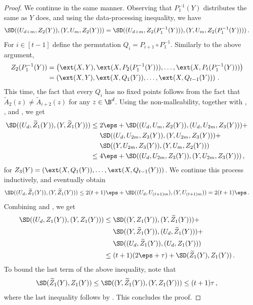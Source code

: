 \begin{proof}
We continue in the same manner. Observing that $P_{1}^{-1}(Y)$ distributes the same as $Y$
does, and using the data-processing inequality, we have
\begin{equation}\label{eq:sec45}
\SD((U_{d+m},Z_{2}(Y)),(Y,U_m,Z_{2}(Y))) = 
\SD((U_{d+m},Z_{2}(P_{1}^{-1}(Y))),(Y,U_m,Z_{2}(P_{1}^{-1}(Y))))\,.
\end{equation}
For $i \in [t-1]$ define the permutation $Q_i = P_{i+1} \circ P_1^{-1}$.
Similarly to the above argument,
\begin{align*}
Z_{2}(P_{1}^{-1}(Y)) &= \left( \ext(X,Y),\ext(X,P_{2}(P_{1}^{-1}(Y))),\ldots,\ext(X,P_{t}(P_{1}^{-1}(Y))) \right) \\
&= \left( \ext(X,Y),\ext(X,Q_{1}(Y)),\ldots,\ext(X,Q_{t-1}(Y)) \right)\,.
\end{align*}
This time, the fact that every $Q_i$ has no
fixed points follows from the fact that $\widetilde{A}_{2}(z) \neq \widetilde{A}_{i+2}(z)$ for
any $z \in \B^{d}$. Using the non-malleability, together with
, ,
and , we get 
\begin{align*}
\SD((U_d,\widetilde{Z}_1(Y)),(Y,\widetilde{Z}_1(Y))) &\le 2\eps + \SD((U_{d},U_{m},Z_{2}(Y)),(U_{d},U_{2m},Z_{3}(Y))) + \\
&~~~~ \SD((U_d,U_{2m},Z_{3}(Y)),(Y,U_{2m},Z_{3}(Y))) + \\
&~~~~ \SD((Y,U_{2m},Z_{3}(Y)),(Y,U_{m},Z_{2}(Y))) \\
&\le 4\eps + \SD((U_d,U_{2m},Z_{3}(Y)),(Y,U_{2m},Z_{3}(Y)))\,,
\end{align*}
for $Z_{3}(Y) = \left( \ext(X,Q_{1}(Y)),\ldots,\ext(X,Q_{t-1}(Y)) \right)$. We continue
this process inductively, and eventually obtain
\begin{equation}\label{eq:sec46}
\SD((U_d,\widetilde{Z}_1(Y)),(Y,\widetilde{Z}_1(Y))) \le 2(t+1)\eps + \SD((U_d,U_{(t+1)m}),(Y,U_{(t+1)m})) = 2(t+1)\eps\,.
\end{equation}
Combining  and 
, we get
\begin{align*}
\SD((U_d,Z_1(Y)),(Y,Z_1(Y))) &\le \SD((Y,Z_1(Y)),(Y,\widetilde{Z}_{1}(Y))) + \\ &~~~~\SD((Y,\widetilde{Z}_1(Y)),(U_d,\widetilde{Z}_1(Y))) + \\
&~~~~\SD((U_d,\widetilde{Z}_1(Y)),(U_d,Z_{1}(Y))) \\
&\le (t+1)(2\eps+\tau) + \SD(\widetilde{Z}_1(Y),Z_{1}(Y))\,.
\end{align*}
To bound the last term of the above inequality, note that
\[
\SD(\widetilde{Z}_1(Y),Z_{1}(Y)) \le \SD((Y,\widetilde{Z}_1(Y)),(Y,Z_{1}(Y))) \le (t+1)\tau\,,
\]
where the last inequality follows by . This concludes the proof.
\end{proof}

